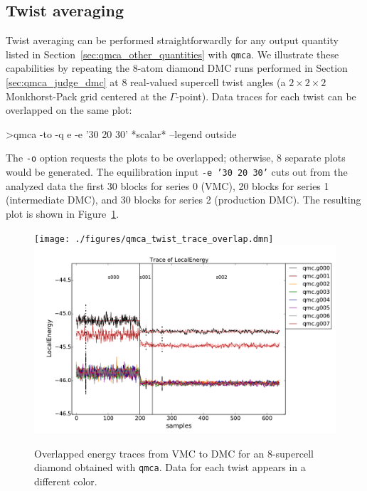 \subsection{Twist averaging}
\label{sec:qmca_twist_average}
Twist averaging can be performed straightforwardly for any 
output quantity listed in Section~\ref{sec:qmca_other_quantities} 
with \texttt{qmca}.  We illustrate these capabilities by 
repeating the 8-atom diamond DMC runs performed in Section 
\ref{sec:qmca_judge_dmc} at 8 real-valued supercell twist 
angles (a $2\times 2\times 2$ Monkhorst-Pack grid centered at 
the $\Gamma$-point).  Data traces for each twist can be overlapped 
on the same plot:
\begin{shade}
>qmca -to -q e -e '30 20 30' *scalar* --legend outside
\end{shade}
\noindent
The \texttt{-o} option requests the plots to be overlapped; otherwise,
8 separate plots would be generated.  The 
equilibration input \texttt{-e '30 20 30'} cuts out from 
the analyzed data the first 30 blocks for series 0 (VMC), 
20 blocks for series 1 (intermediate DMC), and 30 blocks for 
series 2 (production DMC).  The resulting plot is shown in 
Figure~\ref{fig:qmca_twist_overlap}.

\begin{figure}
\begin{center}
\ifdefined\HCode
\texttt{[image: ./figures/qmca\_twist\_trace\_overlap.dmn]}
\else
\includegraphics[trim = 0mm 0mm 0mm 0mm, clip,width=0.9\columnwidth]{./figures/qmca_twist_trace_overlap.pdf}
\fi
\end{center}
\caption{Overlapped energy traces from VMC to DMC for an 8-supercell diamond obtained with \texttt{qmca}.  Data for each twist appears in a different color.}
\label{fig:qmca_twist_overlap}
\end{figure}

